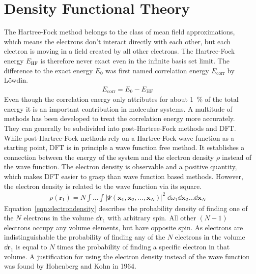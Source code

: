 \section{Density Functional Theory}
\label{sec:dft}

The Hartree-Fock method belongs to the class of mean field approximations,
which means the electrons don't interact directly with each other, but each
electron is moving in a field created by all other electrons. The Hartree-Fock
energy $E_\text{HF}$ is therefore never exact even in the infinite basis set
limit. The difference to the exact energy $E_0$ was first named correlation
energy $E_\text{corr}$ by L\"owdin\autocite{Lowdin_CorrelationProblemManyElectron_1958}.
%
\begin{align}
    E_\text{corr} = E_0 - E_\text{HF}
\end{align}
%
Even though the correlation energy only attributes for about \SI{1}{\percent}
of the total energy it is an important contribution in molecular systems. A
multitude of methods has been developed to treat the correlation energy more
accurately. They can generally be subdivided into post-Hartree-Fock methods and
\ac{DFT}. While post-Hartree-Fock methods rely on a Hartree-Fock wave function
as a starting point, \ac{DFT} is in principle a wave function free method. It
establishes a connection between the energy of the system and the electron
density $\rho$ instead of the wave function. The electron density is observable
and a positive quantity, which makes \ac{DFT} easier to grasp than wave
function based methods. However, the electron density is related to the wave
function via its square. 
%
\begin{align}
    \rho(\mathbf{r}_1)=N\int\dots\int|\Psi(\mathbf{x}_1,\mathbf{x}_2,\dots,\mathbf{x}_N)|^2\;\dd\omega_1\dd\mathbf{x}_2\dots\dd\mathbf{x}_N\label{eqn:electrondensity}
\end{align}
%
Equation~\eqref{eqn:electrondensity} describes the probability density of
finding one of the $N$ electrons in the volume $\dd \mathbf{r}_1$ with
arbitrary spin. All other $(N-1)$ electrons occupy any volume elements, but
have opposite spin. As electrons are indistinguishable the probability of finding
any of the $N$ electrons in the volume $\dd\mathbf{r}_1$ is equal to $N$ times
the probability of finding a specific electron in that volume.  A justification
for using the electron density instead of the wave function was found by
Hohenberg and Kohn in 1964.\autocite{Hohenberg_InhomogeneousElectronGas_1964}

